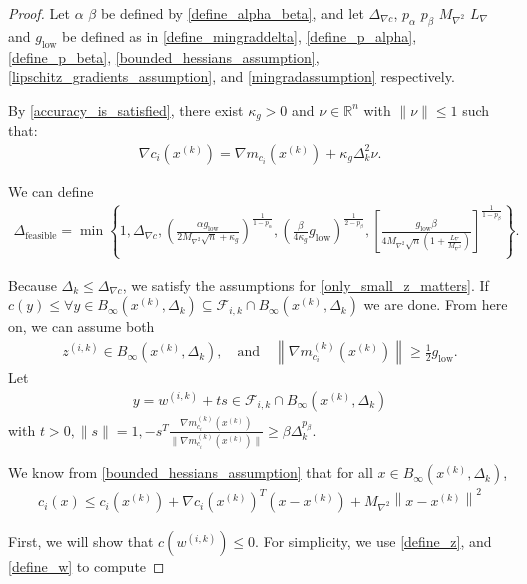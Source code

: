 \documentclass{article}
\theoremstyle{case}
\numberwithin{theorem}{subsection}
\newcommand{\dfeas}{{\Delta_{\textrm{feasible}}}}
\newcommand{\dk}{\Delta_k}
\newcommand{\fik}{{\mathcal F_{i, k}}}
\newcommand{\gmcik}{{\nabla m_{c_i}^{(k)}\left(\xk\right)}}
\newcommand{\hgik}{{\frac{\nabla m^{(k)}_{c_i}(\xk)}{\|\nabla m^{(k)}_{c_i}(\xk)\|}}}
\newcommand{\lipgrad}{{L_{\nabla}}}
\newcommand{\maxhessian}{{M_{\nabla^2}}}
\newcommand{\mingraddelta}{{\Delta_{\nabla c}}}
\newcommand{\mingrad}{{ g_{\textrm{low}} }}
\newcommand{\Rn}{\mathbb R^n}
\newcommand{\tr}{{ B_{\infty}\left(\xk, \dk\right) }}
\newcommand{\wik}{{w^{(i, k)}}}
\newcommand{\xk}{{x^{(k)}}}
\newcommand{\zik}{{z^{(i, k)}}}
\begin{document}
\begin{proof}
Let
$\alpha$
$\beta$
be defined by
\cref{define_alpha_beta},
and let
$\mingraddelta$,
$p_{\alpha}$
$p_{\beta}$
$\maxhessian$
$\lipgrad$
and $\mingrad$
be defined as in
\cref{define_mingraddelta},
\cref{define_p_alpha},
\cref{define_p_beta},
\cref{bounded_hessians_assumption},
\cref{lipschitz_gradients_assumption},
and \cref{mingradassumption}
respectively.

By \cref{accuracy_is_satisfied}, there exist $\kappa_g > 0$ and $\nu\in\Rn$ with $\|\nu\|\le 1$ such that:
\begin{align}
\nabla c_i(\xk) = \nabla m_{c_i}(\xk) + \kappa_g\dk^2\nu. \label{model_error_for_gradient}
\end{align}

We can define
\begin{align}
\dfeas = \min\left\{
1,
\mingraddelta,
\left(\frac{\alpha \mingrad}{2 \maxhessian \sqrt{n} + \kappa_g}\right)^{\frac 1 {1-p_{\alpha}}},
\left(\frac{\beta}{4\kappa_g}\mingrad\right)^{\frac 1 {2 - p_{\beta}}},
\left[\frac {\mingrad  \beta} {4\maxhessian\sqrt{n}\left(1 + \frac {\lipgrad} \maxhessian \right)}\right]^{\frac1 {1 - p_{\beta}} }
\right\}. \label{define_delta_feasible}
\end{align}



Because $\dk \le \mingraddelta$, we satisfy the assumptions for \cref{only_small_z_matters}.
If $c(y) \le \forall y \in \tr \subseteq \fik \cap \tr$ we are done.
From here on, we can assume both
\begin{align}
\zik \in \tr, \quad \textrm{and} \quad \left\|\gmcik\right\| \ge \frac 1 2 \mingrad. \label{z_is_active}
\end{align}
Let
\begin{align}
y = \wik + ts \in \fik \cap \tr \label{t_is_bounded}
\end{align}
with $t > 0, \|s\| = 1, -s^T\hgik \ge \beta \dk^{p_{\beta}}$.

We know from \cref{bounded_hessians_assumption} that for all $x \in \tr$,
\begin{align}
c_i(x) \le c_i(\xk) + \nabla c_i(\xk)^T(x - \xk) + \maxhessian \left \|x - \xk \right\|^2 \label{constraint_lower_bound}
\end{align}

First, we will show that $c(\wik) \le 0$.
For simplicity, we use \cref{define_z}, and \cref{define_w} to compute



\end{proof}
\end{document}
